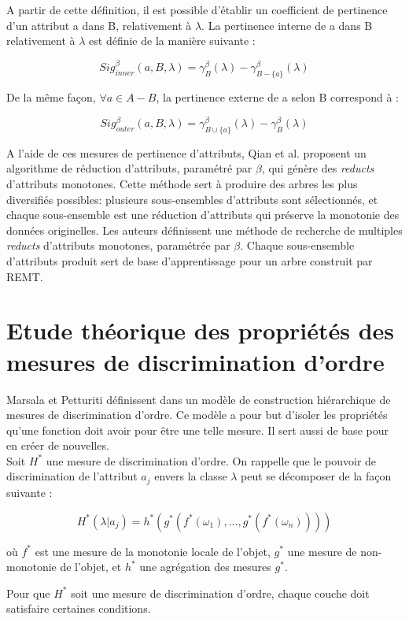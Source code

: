 \documentclass[a4paper]{article}
\begin{document}
\noindent A partir de cette définition, il est possible d'établir un coefficient de
pertinence d'un attribut a dans B, relativement à $\lambda$. La pertinence
interne de a dans B relativement à $\lambda$ est définie de la manière suivante
:

$$ Sig^{\beta}_{inner}(a, B, \lambda) = \gamma^{\beta}_B(\lambda) -
\gamma^{\beta}_{B-\{a\}}(\lambda)$$

\noindent De la même façon, $\forall a \in A-B$, la pertinence externe de a selon B
correspond à :

$$ Sig^{\beta}_{outer}(a, B, \lambda) = \gamma^{\beta}_{B \cup \{a\}}(\lambda) -
\gamma^{\beta}_B(\lambda)$$

A l'aide de ces mesures de pertinence d'attributs, Qian et al. proposent un
algorithme de réduction d'attributs, paramétré par $\beta$, qui génère des
\textit{reducts} d'attributs monotones. Cette méthode sert à produire des arbres
les plus diversifiés possibles: plusieurs sous-ensembles d'attributs sont
sélectionnés, et chaque sous-ensemble est une réduction d'attributs qui préserve
la monotonie des données originelles. Les auteurs définissent une méthode de
recherche de multiples \textit{reducts} d'attributs monotones, paramétrée par
$\beta$. Chaque sous-ensemble d'attributs produit sert de base d'apprentissage
pour un arbre construit par REMT. 

\section{Etude théorique des propriétés des mesures de discrimination d'ordre}
Marsala et Petturiti définissent dans \cite{marsala-rank} un modèle de
construction hiérarchique de mesures de discrimination d'ordre. Ce modèle a pour
but d'isoler les propriétés qu'une fonction doit avoir pour être une telle
mesure. Il sert aussi de base pour en créer de nouvelles. \\

Soit $H^*$ une mesure de discrimination d'ordre. On rappelle que le pouvoir de
discrimination de l'attribut $a_j$ envers la classe $\lambda$ peut se décomposer
de la façon suivante :

$$ H^*(\lambda|a_j) = h^*(g^*(f^*(\omega_1),...,g^*(f^*(\omega_n))))$$

où $f^*$ est une mesure de la monotonie locale de l'objet, $g^*$ une mesure
de non-monotonie de l'objet, et $h^*$ une agrégation des mesures $g^*$.

Pour que $H^*$ soit une mesure de discrimination d'ordre, chaque couche doit
satisfaire certaines conditions.
\end{document}
